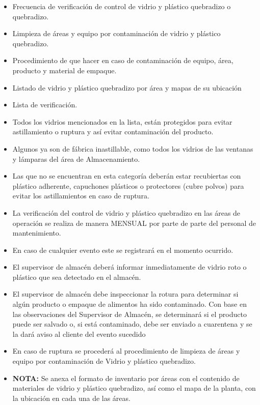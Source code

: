 \begin{itemize}
	\item Frecuencia de verificación de control de vidrio y plástico quebradizo o quebradizo.
	\item Limpieza de áreas y equipo por contaminación de vidrio y plástico quebradizo.
	\item Procedimiento de que hacer en caso de contaminación de equipo, área, producto y material de empaque.
	\item Listado de vidrio y plástico quebradizo por área y mapas de su ubicación
	\item Lista de verificación.
	\item Todos los vidrios mencionados en la lista, están protegidos para evitar astillamiento o ruptura y así evitar contaminación del producto.
	\item Algunos ya son de fábrica inastillable, como todos los vidrios de las ventanas y lámparas del área de Almacenamiento.
	\item Las que no se encuentran en esta categoría deberán estar recubiertas con plástico adherente, capuchones plásticos o protectores (cubre polvos) para evitar los astillamientos en caso de ruptura.
	\item La verificación del control de vidrio y plástico quebradizo en las áreas de operación se realiza de manera MENSUAL por parte de parte del personal de mantenimiento.
	\item En caso de cualquier evento este se registrará en el momento ocurrido.
	\item El supervisor de almacén deberá informar inmediatamente de vidrio roto o plástico que sea detectado en el almacén.
	\item El supervisor de almacén debe inspeccionar la rotura para determinar si algún producto o empaque de alimentos ha sido contaminado. Con base en las observaciones del Supervisor de Almacén, se determinará si el producto puede ser salvado o, si está contaminado, debe ser enviado a cuarentena y se la dará aviso al cliente del evento sucedido
	\item En caso de ruptura se procederá al procedimiento de limpieza de áreas y equipo por contaminación de Vidrio y plástico quebradizo.
	\item\textbf{NOTA:} Se anexa el formato de inventario por áreas con el contenido de materiales de vidrio y plástico quebradizo, así como el mapa de la planta, con la ubicación en cada una de las áreas.
\end{itemize}

